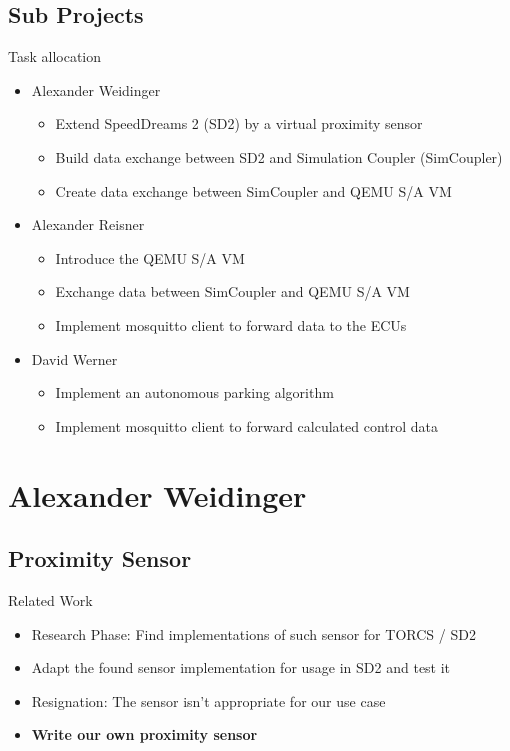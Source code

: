 \documentclass[aspectratio=169]{beamer}
\begin{document}
  \subsection{Sub Projects}
  \begin{frame}{Task allocation}
    \begin{itemize}
      \item Alexander Weidinger
      \begin{itemize}
        \item Extend SpeedDreams 2 (SD2) by a virtual proximity sensor
        \item Build data exchange between SD2 and Simulation Coupler (SimCoupler)
        \item Create data exchange between SimCoupler and QEMU S/A VM
      \end{itemize}
      \item Alexander Reisner
      \begin{itemize}
        \item Introduce the QEMU S/A VM
        \item Exchange data between SimCoupler and QEMU S/A VM
        \item Implement mosquitto client to forward data to the ECUs
      \end{itemize}
      \item David Werner
      \begin{itemize}
        \item Implement an autonomous parking algorithm
        \item Implement mosquitto client to forward calculated control data
      \end{itemize}
    \end{itemize}
  \end{frame}

  \section{Alexander Weidinger}
  \subsection{Proximity Sensor}
  \begin{frame}{Related Work}
    \begin{itemize}
      \item<1-> Research Phase: Find implementations of such sensor for TORCS / SD2
      \item<2-> Adapt the found sensor implementation for usage in SD2 and test it
      \item<3-> Resignation: The sensor isn't appropriate for our use case
      \item<4-> \textbf{Write our own proximity sensor}
    \end{itemize}
  \end{frame}
\end{document}
